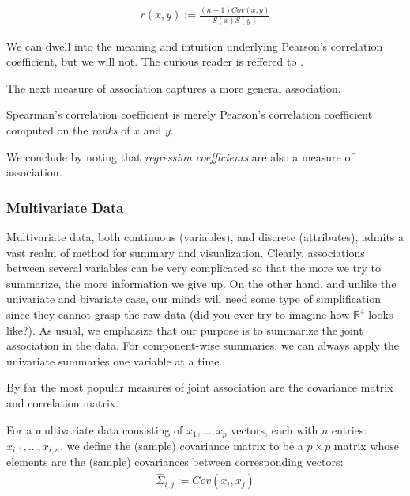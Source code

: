 \begin{definition}
\begin{align}
	r(x,y):= \frac{(n-1) Cov(x,y)}{S(x) S(y)}
\end{align}
\end{definition}
We can dwell into the meaning and intuition underlying Pearson's correlation coefficient, but we will not. 
The curious reader is reffered to \cite{rodgers_thirteen_1988}.

The next measure of association captures a more general association.
\begin{definition}
Spearman's correlation coefficient is merely Pearson's correlation coefficient computed on the \emph{ranks} of $x$ and $y$. 
\end{definition}

We conclude by noting that \emph{regression coefficients} are also a measure of association. 





\subsubsection{Multivariate Data}
Multivariate data, both continuous (variables), and discrete (attributes), admits a vast realm of method for summary and visualization.
Clearly, associations between several variables can be very complicated so that the more we try to summarize, the more information we give up. On the other hand, and unlike the univariate and bivariate case, our minds will need some type of simplification since they cannot grasp the raw data (did you ever try to imagine how $\mathbb{R}^4$ looks like?).
As usual, we emphasize that our purpose is to summarize the joint association in the data. 
For component-wise summaries, we can always apply the univariate summaries one variable at a time. 

By far the most popular measures of joint association are the covariance matrix and correlation matrix.

\begin{definition}
For a multivariate data consisting of $x_1,\dots,x_p$ vectors, each with $n$ entries: $x_{i,1},\dots,x_{i,n}$, we define the (sample) covariance matrix to be a $p\times p$ matrix whose elements are the (sample) covariances between corresponding vectors:
\begin{align}
	\hat{\Sigma}_{i,j}:= Cov(x_i, x_j)
\end{align}
\end{definition}


